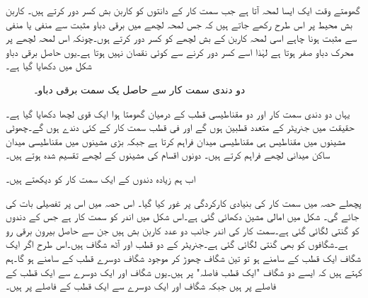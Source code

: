 گھومتے وقت ایک ایسا لمحہ آتا ہے جب سمت کار کے  دانتوں کو کاربن بش  کسر دور کرتے ہیں۔ کاربن بش  محیط پر اس طرح رکھے جاتے ہیں کہ جس لمحہ لچھے میں برقی دباو مثبت سے منفی یا منفی سے مثبت ہونا چاہے اسی لمحہ کاربن کے بش لچھے کو کسر دور کرتے ہوں۔چونکہ اس لمحہ  لچھے پر محرک  دباو صفر ہوتا ہے لہٰذا اسے کسر دور کرنے سے کوئی نقصان نہیں ہوتا ہے۔یوں حاصل برقی دباو شکل   میں دکھایا گیا ہے۔
\begin{figure}
\centering
\caption{دو دندی سمت کار سے حاصل یک سمت  برقی دباو۔}
\label{شکل_یکسمتی_دو_دندوں_کا_سمتکار}
\end{figure}


یہاں دو دندی سمت کار اور دو مقناطیسی قطب کے درمیان گھومتا ہوا ایک قوی لچھا دکھایا گیا ہے۔حقیقت میں جنریٹر کے متعدد قطبین ہوں گے اور فی قطب  سمت کار کے کئی دندے ہوں گے۔چھوٹی مشینوں میں مقناطیس ہی مقناطیسی میدان  فراہم کرتا ہے جبکہ بڑی مشینوں میں مقناطیسی میدان ساکن میدانی لچھے فراہم کرتے ہیں۔ دونوں اقسام کی مشینوں  کے لچھے تقسیم شدہ ہوتے ہیں۔

اب ہم زیادہ دندوں کے ایک سمت کار کو دیکھتے ہیں۔

پچھلے حصہ میں سمت کار کی بنیادی کارکردگی پر غور کیا گیا۔ اس حصہ میں اس پر تفصیلی بات کی جائے گی۔ شکل  میں امالی مشین دکھائی گئی ہے۔اس شکل میں اندر کو سمت کار ہے جس کے دندوں کو گنتی لگائی گئی ہے۔سمت کار کی اندر جانب دو عدد  کاربن بش ہیں جن سے حاصل  بیرون  برقی رو  ہے۔شگافوں کو بھی گنتی لگائی گئی  ہے۔جنریٹر کے دو قطب اور آٹھ شگاف ہیں۔اس طرح اگر ایک شگاف ایک قطب کے سامنے ہو تو تین شگاف چھوڑ کر موجود شگاف دوسرے قطب کے سامنے ہو گا۔ہم کہتے ہیں کہ ایسے دو شگاف "ایک قطب فاصلہ" پر ہیں۔یوں شگاف  اور  ایک دوسرے سے ایک قطب کے فاصلے پر ہیں جبکہ    شگاف  اور  ایک دوسرے سے ایک قطب کے فاصلے پر ہیں۔

